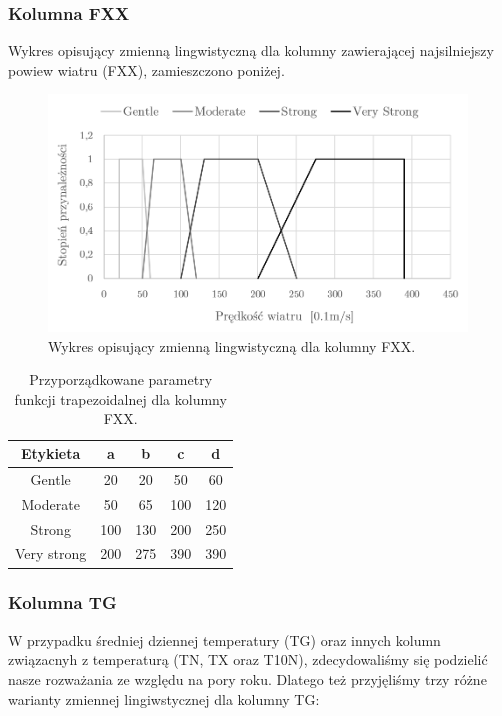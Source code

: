\documentclass{classrep}
\begin{document}
\subsubsection{Kolumna FXX}
Wykres opisujący zmienną lingwistyczną dla kolumny zawierającej najsilniejszy powiew wiatru (FXX), zamieszczono poniżej.
\begin{figure}[H]
	\centering
	\includegraphics[width=0.99\textwidth]{Pictures/TermsCharts/FXX.png}
	\caption{Wykres opisujący zmienną lingwistyczną dla kolumny FXX.}
\end{figure}

\begin{table}[H]
	\centering
	\begin{tabular}{c c c c c} 
		\hline
		\textbf{Etykieta} & \textbf{a} & \textbf{b} & \textbf{c} & \textbf{d}\\ [0.5ex] 
		\hline
		\hline 
Gentle	 & 20 & 20 & 50 & 60 \\
Moderate & 50 & 65 & 100 & 120 \\
Strong	 & 100 & 130 & 200 & 250 \\
Very strong & 200 & 275 & 390 & 390 \\
		\hline
	\end{tabular}
	\caption{Przyporządkowane parametry funkcji trapezoidalnej dla kolumny FXX.}
\end{table}

\clearpage



\subsubsection{Kolumna TG}
W przypadku średniej dziennej temperatury (TG) oraz innych kolumn związacnyh z temperaturą (TN, TX oraz T10N), zdecydowaliśmy się podzielić nasze rozważania ze względu na pory roku. Dlatego też przyjęliśmy trzy różne warianty zmiennej lingiwstycznej dla kolumny TG:
\end{document}

